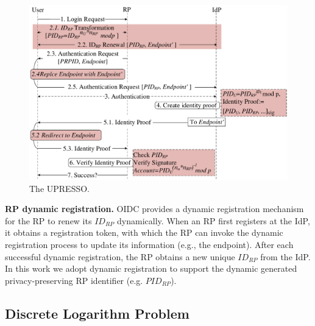 \begin{figure}[t]
  \centering
  \includegraphics[width=\linewidth]{fig/overview1.pdf}
  \caption{The UPRESSO.}
  \label{fig:UPRESSO}
\end{figure}

\noindent\textbf{RP dynamic registration.} OIDC provides a dynamic registration mechanism~\cite{DynamicRegistration} for the RP to renew its $ID_{RP}$ dynamically. %
When an RP first registers at the IdP, it obtains a registration token, with which the  RP can invoke the dynamic registration process to
update its information (e.g., the endpoint). %
After each successful dynamic registration, the RP obtains a new unique $ID_{RP}$ from the IdP.
In this work we adopt dynamic registration to support the dynamic generated privacy-preserving RP identifier (e.g. $PID_{RP}$).


\subsection{Discrete Logarithm Problem}
\label{sec:dlp}

